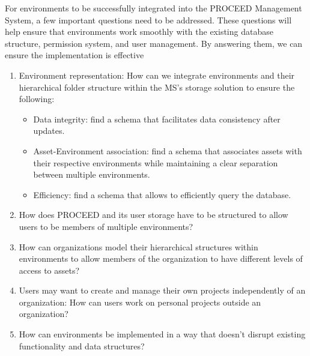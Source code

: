 For environments to be successfully integrated into the PROCEED Management System,
a few important questions need to be addressed.
These questions will help ensure that environments work smoothly with the existing database structure,
permission system, and user management.
By answering them, we can ensure the implementation is effective



\begin{enumerate}

	\item Environment representation: How can we integrate environments and their hierarchical
	      folder structure within the MS's storage solution to ensure the following:
	      \begin{itemize}
		      \item Data integrity: find a schema that facilitates data consistency after updates.
		      \item Asset-Environment association: find a schema that associates assets with their
		            respective environments while maintaining a clear separation between
		            multiple environments.
		      \item Efficiency: find a schema that allows to efficiently query the database.
	      \end{itemize}

	\item How does PROCEED and its user storage have to be structured to allow users to be
	      members of multiple environments?

	\item How can organizations model their hierarchical structures within environments
	      to allow members of the organization to have different levels of access to assets?

	\item Users may want to create and manage their own projects independently of an
	      organization: How can users work on personal projects outside an organization?

	\item How can environments be implemented in a way that doesn't disrupt existing
	      functionality and data structures?



\end{enumerate}

